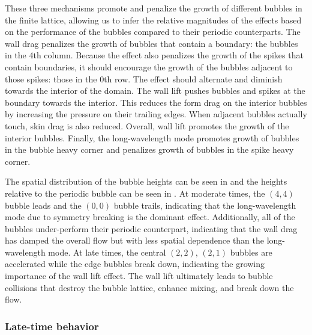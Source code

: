 These three mechanisms promote and penalize the growth of different bubbles in the finite lattice, allowing us to infer the relative magnitudes of the effects based on the performance of the bubbles compared to their periodic counterparts.
The wall drag penalizes the growth of bubbles that contain a boundary: the bubbles in the 4th column.
Because the effect also penalizes the growth of the spikes that contain boundaries, it should encourage the growth of the bubbles adjacent to those spikes: those in the 0th row.
The effect should alternate and diminish towards the interior of the domain.
The wall lift pushes bubbles and spikes at the boundary towards the interior.
This reduces the form drag on the interior bubbles by increasing the pressure on their trailing edges.
When adjacent bubbles actually touch, skin drag is also reduced.
Overall, wall lift promotes the growth of the interior bubbles.
Finally, the long-wavelength mode promotes growth of bubbles in the bubble heavy corner and penalizes growth of bubbles in the spike heavy corner.

The spatial distribution of the bubble heights can be seen in  and the heights relative to the periodic bubble can be seen in .
At moderate times, the $(4,4)$ bubble leads and the $(0,0)$ bubble trails, indicating that the long-wavelength mode due to symmetry breaking is the dominant effect.
Additionally, all of the bubbles under-perform their periodic counterpart, indicating that the wall drag has damped the overall flow but with less spatial dependence than the long-wavelength mode.
At late times, the central $(2,2)$, $(2,1)$  bubbles are accelerated while the edge bubbles break down, indicating the growing importance of the wall lift effect.
The wall lift ultimately leads to bubble collisions that destroy the bubble lattice, enhance mixing, and break down the flow.

\subsubsection{Late-time behavior}

